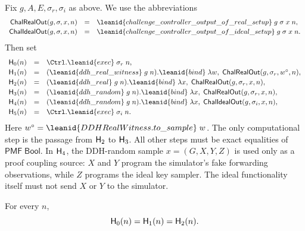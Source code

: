 \begin{definition}
Fix \(g,A,E,\sigma_r,\sigma_i\) as above.  We use the abbreviations
\[
\begin{array}{rcl}
\ChalROut(g,\sigma,x,n)
  &=&
  \leanid{challenge\_controller\_output\_of\_real\_setup}\;
    g\;\sigma\;x\;n,\\[0.2em]
\ChalIOut(g,\sigma,x,n)
  &=&
  \leanid{challenge\_controller\_output\_of\_ideal\_setup}\;
    g\;\sigma\;x\;n .
\end{array}
\]
Then set
\[
\begin{array}{rcl}
\Hyb_0(n)
  &=&
  \Ctrl.\leanid{exec}\;\sigma_r\;n,\\[0.2em]
\Hyb_1(n)
  &=&
  (\leanid{ddh\_real\_witness}\;g\;n).\leanid{bind}\;
    \lambda w,\;
      \ChalROut(g,\sigma_r,w^\circ,n),\\[0.2em]
\Hyb_2(n)
  &=&
  (\leanid{ddh\_real}\;g\;n).\leanid{bind}\;
    \lambda x,\;
      \ChalROut(g,\sigma_r,x,n),\\[0.2em]
\Hyb_3(n)
  &=&
  (\leanid{ddh\_random}\;g\;n).\leanid{bind}\;
    \lambda x,\;
      \ChalROut(g,\sigma_r,x,n),\\[0.2em]
\Hyb_4(n)
  &=&
  (\leanid{ddh\_random}\;g\;n).\leanid{bind}\;
    \lambda x,\;
      \ChalIOut(g,\sigma_i,x,n),\\[0.2em]
\Hyb_5(n)
  &=&
  \Ctrl.\leanid{exec}\;\sigma_i\;n .
\end{array}
\]
Here \(w^\circ=\leanid{DDHRealWitness.to\_sample}\;w\).  The only
computational step is the passage from \(\mathsf{H}_2\) to \(\mathsf{H}_3\).  All other
steps must be exact equalities of \(\mathsf{PMF}\;\mathsf{Bool}\).
In \(\mathsf{H}_4\), the DDH-random sample \(x=(G,X,Y,Z)\) is used only as a proof
coupling source: \(X\) and \(Y\) program the simulator's fake forwarding
observations, while \(Z\) programs the ideal key sampler.  The ideal
functionality itself must not send \(X\) or \(Y\) to the simulator.
\end{definition}

\begin{lemma}
For every \(n\),
\[
  \mathsf{H}_0(n)=\mathsf{H}_1(n)=\mathsf{H}_2(n).
\]
\end{lemma}

